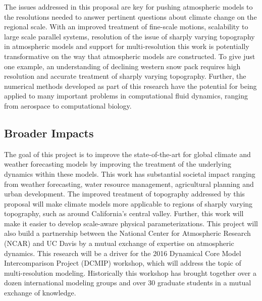 \documentclass[11pt]{article}
\begin{document}
The issues addressed in this proposal are key for pushing atmospheric models to the resolutions needed to answer pertinent questions about climate change on the regional scale.  With an improved treatment of fine-scale motions, scalability to large scale parallel systems, resolution of the issue of sharply varying topography in atmospheric models and support for multi-resolution this work is potentially transformative on the way that atmospheric models are constructed.  To give just one example, an understanding of declining western snow pack requires high resolution and accurate treatment of sharply varying topography.  Further, the numerical methods developed as part of this research have the potential for being applied to many important problems in computational fluid dynamics, ranging from aerospace to computational biology.

\vspace{-0.5cm}
\subsection*{Broader Impacts}
\vspace{-0.5cm}

The goal of this project is to improve the state-of-the-art for global climate and weather forecasting models by improving the treatment of the underlying dynamics within these models.  This work has substantial societal impact ranging from weather forecasting, water resource management, agricultural planning and urban development.  The improved treatment of topography addressed by this proposal will make climate models more applicable to regions of sharply varying topography, such as around California's central valley.  Further, this work will make it easier to develop scale-aware physical parameterizations.  This project will also build a partnership between the National Center for Atmospheric Research (NCAR) and UC Davis by a mutual exchange of expertise on atmospheric dynamics.  This research will be a driver for the 2016 Dynamical Core Model Intercomparison Project (DCMIP) workshop, which will address the topic of multi-resolution modeling.  Historically this workshop has brought together over a dozen international modeling groups and over 30 graduate students in a mutual exchange of knowledge.
\end{document}
